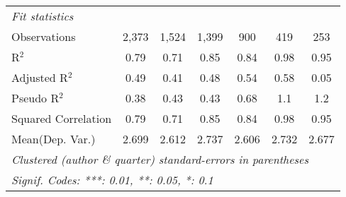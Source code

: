 \begin{tabular}{lcccccc}
   \midrule
   \emph{Fit statistics}\\
   Observations                                               & 2,373   & 1,524   & 1,399       & 900           & 419            & 253\\  
   R$^2$                                                      & 0.79    & 0.71    & 0.85        & 0.84          & 0.98           & 0.95\\  
   Adjusted R$^2$                                             & 0.49    & 0.41    & 0.48        & 0.54          & 0.58           & 0.05\\  
   Pseudo R$^2$                                               & 0.38    & 0.43    & 0.43        & 0.68          & 1.1            & 1.2\\  
   Squared Correlation                                        & 0.79    & 0.71    & 0.85        & 0.84          & 0.98           & 0.95\\  
Mean(Dep. Var.) & 2.699 & 2.612 & 2.737 & 2.606 & 2.732 & 2.677 \\
   \midrule \midrule
   \multicolumn{7}{l}{\emph{Clustered (author \& quarter) standard-errors in parentheses}}\\
   \multicolumn{7}{l}{\emph{Signif. Codes: ***: 0.01, **: 0.05, *: 0.1}}\\
\end{tabular}
\par\endgroup
